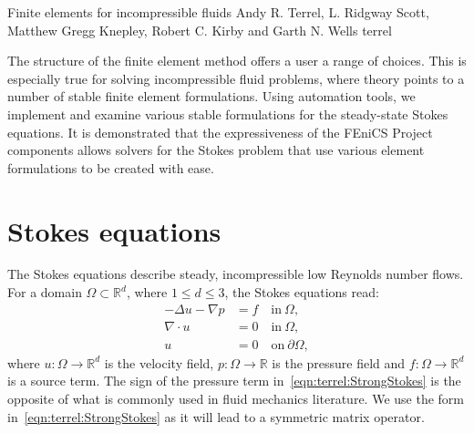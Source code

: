               {Finite elements for incompressible fluids}
              {Andy R. Terrel, L. Ridgway Scott, Matthew Gregg Knepley,
               Robert C. Kirby and Garth N. Wells}
              {terrel}

The structure of the finite element method offers a user a range of
choices.  This is especially true for solving incompressible fluid
problems, where theory points to a number of stable finite element
formulations. Using automation tools, we implement and examine various
stable formulations for the steady-state Stokes equations.  It is
demonstrated that the expressiveness of the FEniCS Project components
allows solvers for the Stokes problem that use various element
formulations to be created with ease.

\section{Stokes equations}
\label{sec:terrel:Stokes}

The Stokes equations describe steady, incompressible low Reynolds number
flows. For a domain $\Omega \subset \mathbb{R}^{d}$, where $1 \le d \le
3$, the Stokes equations read:
%
\begin{align}
     -\Delta u - \nabla p &= f \quad \mbox{in} \ \Omega,
\label{eqn:terrel:StrongStokes}
\\
      \nabla\cdot u &= 0 \quad \mbox{in} \ \Omega,
\label{eqn:terrel:StrongStokes_icomp}
\\
      u &= 0 \quad \mbox{on} \  \partial \Omega,
\end{align}
%
where $u : \Omega \rightarrow \mathbb{R}^{d}$ is the velocity field,
$p : \Omega \rightarrow \mathbb{R}$ is the pressure field and $f :
\Omega \rightarrow \mathbb{R}^{d}$ is a source term. The sign of the
pressure term in~\eqref{eqn:terrel:StrongStokes} is the opposite of
what is commonly used in fluid mechanics literature. We use the form
in~\eqref{eqn:terrel:StrongStokes} as it will lead to a symmetric matrix
operator.

